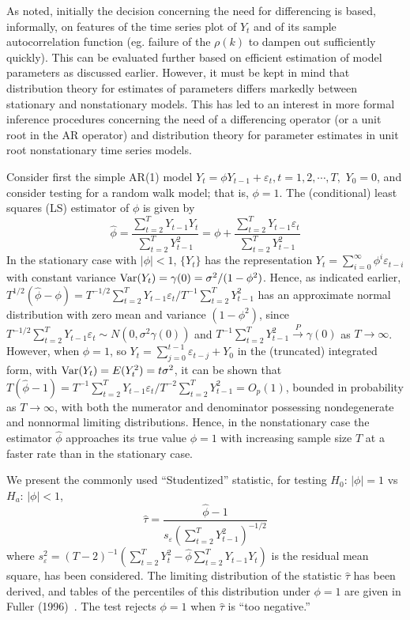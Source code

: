 As noted, initially the decision concerning the need for differencing is based, informally, on features of the time series plot of $Y_t$ and of its sample autocorrelation function (eg. failure of the $\rho(k)$ to dampen out sufficiently quickly). This can be evaluated further based on efficient estimation of model parameters as discussed earlier. However, it must be kept in mind that distribution theory for estimates of parameters differs markedly between stationary and nonstationary models. This has led to an interest in more formal inference procedures concerning the need of a differencing operator (or a unit root in the AR operator) and distribution theory for parameter estimates in unit root nonstationary time series models.


Consider first the simple AR(1) model $Y_t = \phi Y_{t-1} + \varepsilon_t, t = 1,2,\cdots,T,$ $Y_0 = 0$, and consider testing for a random walk model; that is, $\phi = 1$. The (conditional) least squares (LS) estimator of $\phi$ is given by
	\begin{equation}\label{eqn:futurereffirst}
	\hat{\phi} = \dfrac{\sum_{t=2}^T Y_{t-1}Y_t}{\sum_{t=2}^T Y_{t-1}^2} = \phi + \dfrac{\sum_{t=2}^T Y_{t-1}\varepsilon_t}{\sum_{t=2}^T Y_{t-1}^2}
	\end{equation}
In the stationary case with $|\phi| < 1$, $\{Y_t\}$ has the representation $Y_t = \sum_{i=0}^\infty\phi^i\varepsilon_{t-i}$ with constant variance $\operatorname{Var}(Y_t) = \gamma(0) = \sigma^2/(1-\phi^2)$. Hence, as indicated earlier, $T^{1/2}(\hat{\phi} - \phi) = T^{-1/2}\sum_{t=2}^T Y_{t-1}\varepsilon_t/T^{-1}\sum_{t=2}^TY_{t-1}^2$ has an approximate normal distribution with zero mean and variance $(1 - \phi^2)$, since $T^{-1/2}\sum_{t=2}^T Y_{t-1}\varepsilon_t \sim N(0,\sigma^2\gamma(0))$ and $T^{-1}\sum_{t=2}^TY_{t-1}^2 \xrightarrow{P} \gamma(0)$ as $T \to \infty$. However, when $\phi = 1$, so $Y_t = \sum_{j=0}^{t-1}\varepsilon_{t-j} + Y_0$ in the (truncated) integrated form, with $\operatorname{Var}(Y_t) = E(Y_t^2) = t\sigma^2$, it can be shown that $T(\hat{\phi} - 1) = T^{-1}\sum_{t=2}^T Y_{t-1}\varepsilon_t/T^{-2}\sum_{t=2}^T Y_{t-1}^2 = O_p(1)$, bounded in probability as $T \rightarrow \infty$, with both the numerator and denominator possessing nondegenerate and nonnormal limiting distributions. Hence, in the nonstationary case the estimator $\hat{\phi}$ approaches its true value $\phi = 1$ with increasing sample size $T$ at a faster rate than in the stationary case.


We present the commonly used ``Studentized'' statistic, for testing $H_0: \, |\phi|=1$ vs $H_a: \, |\phi|<1$,
	\begin{equation}\label{eqn:hattaunew}
	\hat{\tau} = \dfrac{\hat{\phi} - 1}{s_{\varepsilon}\left(\sum_{t=2}^T Y_{t-1}^2\right)^{-1/2}}
	\end{equation}
where $s_\varepsilon^2 = (T - 2)^{-1}(\sum_{t=2}^T Y_t^2 - \hat{\phi}\sum_{t=2}^T Y_{t-1}Y_t)$ is the residual mean square, has been considered. The limiting distribution of the statistic $\hat{\tau}$ has been derived, and tables of the percentiles of this distribution under $\phi = 1$ are given in Fuller (1996)~\cite{fuller1996}. The test rejects $\phi = 1$ when $\hat{\tau}$ is ``too negative.''


